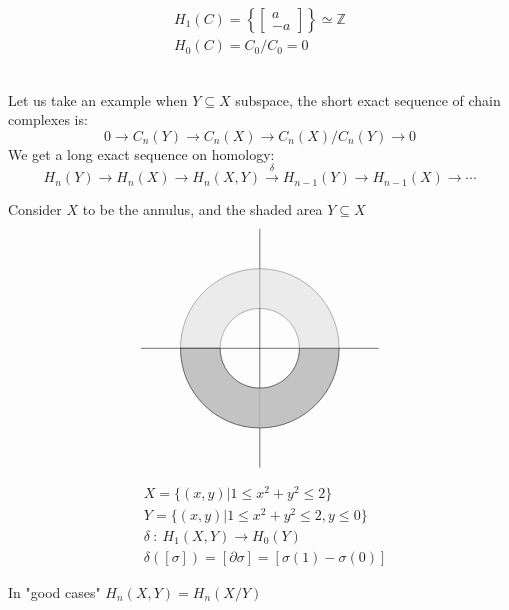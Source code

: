 \documentclass[11pt,a4paper]{report}
\begin{document}
\begin{Ex}
                \begin{align*}
                  H_1(C) = \left\{\begin{bmatrix}a\\-a\end{bmatrix}\right\} \simeq \mathbb{Z} \\
                  H_0(C) = C_0 / C_0 = 0
                \end{align*}
                \\
                \end{Ex}
                Let us take an example when $Y \subseteq X$ subspace, the short exact sequence of chain complexes is: \\
                \[
                0 \rightarrow C_n(Y) \rightarrow C_n(X) \rightarrow C_n(X) / C_n(Y) \rightarrow 0
                \]
                We get a long exact sequence on homology: \\
                \[ H_n(Y) \rightarrow H_n(X) \rightarrow H_n(X, Y) \xrightarrow{\delta} H_{n-1}(Y) \rightarrow H_{n-1}(X) \rightarrow \cdots \]

                \begin{Ex} Consider $X$ to be the annulus, and the shaded area $Y \subseteq X$
                \[
                \begin{tikzpicture}
                    \draw (-3,0) -- (3,0);
                    \draw (0,-3) -- (0,3);
                    \filldraw[fill=gray!30,opacity=0.5] (-180:1) arc (-180:180:1) -- (180:2) arc (180:-180:2) -- cycle;
                    \filldraw[fill=black!30,opacity=0.7] (0:1) arc (0:-180:1) -- (-180:2) arc (-180:0:2) -- cycle;

                \end{tikzpicture}
                \]
                    \begin{align*}
                    &X = \{(x,y) | 1 \le x^2 + y^2 \le 2\}\\
                    &Y = \{(x,y) | 1 \le x^2 + y^2 \le 2, y \le 0\}\\
                    &\delta\ :\ H_1(X,Y) \rightarrow H_0(Y)\\
                    &\delta([\sigma]) = [\partial \sigma] = [\sigma(1) - \sigma(0)]
                    \end{align*}
                \end{Ex}

                In "good cases" $H_n(X,Y) = H_n(X/Y)$ \\
\end{document}
